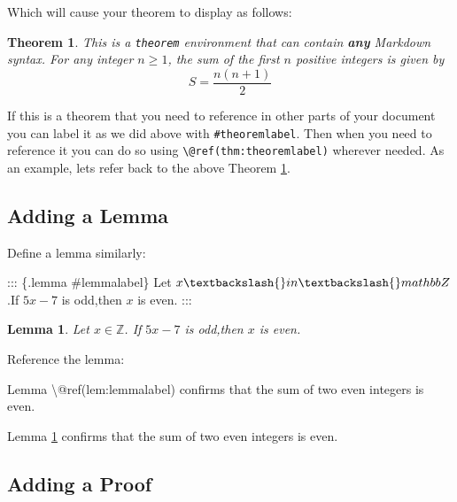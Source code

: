\documentclass[
]{book}
\newenvironment{Shaded}{\begin{snugshade}}{\end{snugshade}}
\newcommand{\NormalTok}[1]{#1}
\newtheorem{theorem}{Theorem}[chapter]
\newtheorem{lemma}{Lemma}[chapter]
\theoremstyle{definition}
\theoremstyle{definition}
\theoremstyle{definition}
\theoremstyle{definition}
\theoremstyle{remark}
\begin{document}
Which will cause your theorem to display as follows:

\begin{theorem}
\protect\hypertarget{thm:theoremlabel}{}\label{thm:theoremlabel}This is a \texttt{theorem} environment that can contain \textbf{any}
\emph{Markdown} syntax.
For any integer \(n \geq 1\), the sum of the first \(n\) positive integers is given by
\[
S = \frac{n(n + 1)}{2}
\]
\end{theorem}

If this is a theorem that you need to reference in other parts of your document you can label it as we did above with \texttt{\#theoremlabel}. Then when you need to reference it you can do so using \texttt{\textbackslash{}@ref(thm:theoremlabel)} wherever needed. As an example, lets refer back to the above Theorem \ref{thm:theoremlabel}.

\subsection{Adding a Lemma}\label{adding-a-lemma}

Define a lemma similarly:

\begin{Shaded}
\begin{Highlighting}[]
\NormalTok{::: \{.lemma \#lemmalabel\}}
\NormalTok{Let $x\textbackslash{}in \textbackslash{}mathbb Z$.If $5x{-}7$ is odd,then $x$ is even.}
\NormalTok{:::}
\end{Highlighting}
\end{Shaded}

\begin{lemma}
\protect\hypertarget{lem:lemmalabel}{}\label{lem:lemmalabel}Let \(x \in \mathbb Z\). If \(5x-7\) is odd,then \(x\) is even.
\end{lemma}

Reference the lemma:

\begin{Shaded}
\begin{Highlighting}[]
\NormalTok{Lemma \textbackslash{}@ref(lem:lemmalabel) confirms that the sum of two even integers is even.}
\end{Highlighting}
\end{Shaded}

Lemma \ref{lem:lemmalabel} confirms that the sum of two even integers is even.

\subsection{Adding a Proof}\label{adding-a-proof}
\end{document}

